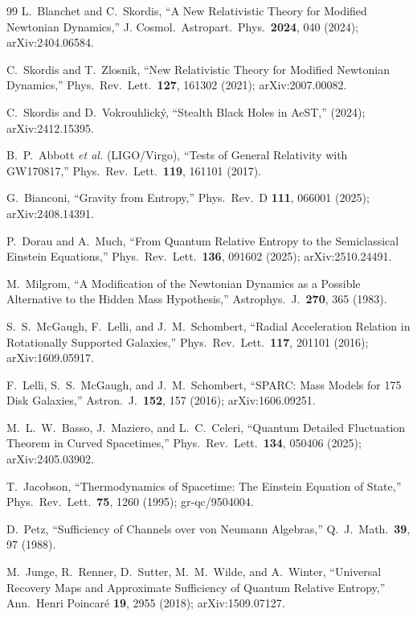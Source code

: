 \documentclass[aps,prd,preprint,superscriptaddress,longbibliography]{revtex4-2}
\begin{document}
\begin{thebibliography}{99}
L.~Blanchet and C.~Skordis,
``A New Relativistic Theory for Modified Newtonian Dynamics,''
J. Cosmol.\ Astropart.\ Phys.\ \textbf{2024}, 040 (2024);
arXiv:2404.06584.

C.~Skordis and T.~Zlosnik,
``New Relativistic Theory for Modified Newtonian Dynamics,''
Phys.\ Rev.\ Lett.\ \textbf{127}, 161302 (2021);
arXiv:2007.00082.

C.~Skordis and D.~Vokrouhlick\'{y},
``Stealth Black Holes in AeST,''
(2024); arXiv:2412.15395.

B.~P.~Abbott \emph{et al.} (LIGO/Virgo),
``Tests of General Relativity with GW170817,''
Phys.\ Rev.\ Lett.\ \textbf{119}, 161101 (2017).

G.~Bianconi,
``Gravity from Entropy,''
Phys.\ Rev.\ D \textbf{111}, 066001 (2025);
arXiv:2408.14391.

P.~Dorau and A.~Much,
``From Quantum Relative Entropy to the Semiclassical Einstein
Equations,''
Phys.\ Rev.\ Lett.\ \textbf{136}, 091602 (2025);
arXiv:2510.24491.

M.~Milgrom,
``A Modification of the Newtonian Dynamics as a Possible
Alternative to the Hidden Mass Hypothesis,''
Astrophys.\ J.\ \textbf{270}, 365 (1983).

S.~S.~McGaugh, F.~Lelli, and J.~M.~Schombert,
``Radial Acceleration Relation in Rotationally Supported Galaxies,''
Phys.\ Rev.\ Lett.\ \textbf{117}, 201101 (2016);
arXiv:1609.05917.

F.~Lelli, S.~S.~McGaugh, and J.~M.~Schombert,
``SPARC: Mass Models for 175 Disk Galaxies,''
Astron.\ J.\ \textbf{152}, 157 (2016);
arXiv:1606.09251.

M.~L.~W.~Basso, J.~Maziero, and L.~C.~Celeri,
``Quantum Detailed Fluctuation Theorem in Curved Spacetimes,''
Phys.\ Rev.\ Lett.\ \textbf{134}, 050406 (2025);
arXiv:2405.03902.

T.~Jacobson,
``Thermodynamics of Spacetime: The Einstein Equation of State,''
Phys.\ Rev.\ Lett.\ \textbf{75}, 1260 (1995);
gr-qc/9504004.

D.~Petz,
``Sufficiency of Channels over von Neumann Algebras,''
Q.~J.~Math.\ \textbf{39}, 97 (1988).

M.~Junge, R.~Renner, D.~Sutter, M.~M.~Wilde, and A.~Winter,
``Universal Recovery Maps and Approximate Sufficiency of Quantum
Relative Entropy,''
Ann.\ Henri Poincar\'{e} \textbf{19}, 2955 (2018);
arXiv:1509.07127.


\end{thebibliography}
\end{document}
